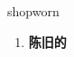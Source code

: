 
\begin{frame}
{\huge shopworn}
\begin{center}
\begin{enumerate}\Large
  \item \textbf{陈旧的}
\end{enumerate}
\end{center}
\end{frame}
